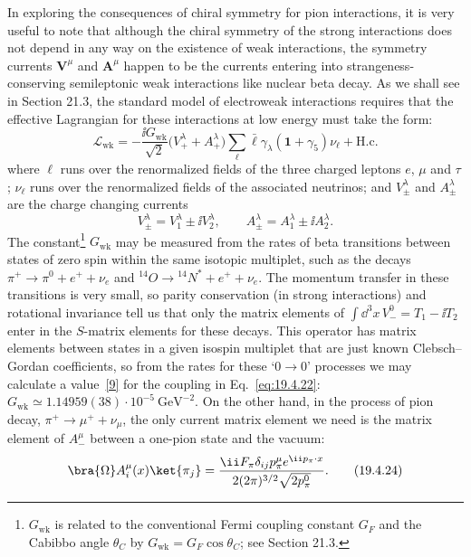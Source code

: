 In exploring the consequences of chiral symmetry for pion interactions, it is very useful to note that although the chiral symmetry of the strong interactions does not depend in any way on the existence of weak interactions, the symmetry currents $\mathbf{V}^\mu$ and $\mathbf{A}^\mu$ happen to be the currents entering into strangeness-conserving semileptonic weak interactions like nuclear beta decay. As we shall see in Section 21.3, the standard model of electroweak interactions requires that the effective Lagrangian for these interactions at low energy must take the form:
\begin{equation}
\mathcal L_{\mathrm{wk}}
=-\frac{\ii G_{\mathrm{wk}}}{\sqrt2}
\bigl(V_+^\lambda+A_+^\lambda\bigr)
\sum_\ell\bar\ell\gamma_\lambda(\mathbf{1}+\gamma_5)\nu_\ell
+\mathrm{H.c.}
\tag{19.4.22}\label{eq:19.4.22}
\end{equation}
where $\ell$ runs over the renormalized fields of the three charged leptons $e$, $\mu$ and $\tau$; $\nu_\ell$ runs over the renormalized fields of the associated neutrinos; and $V_\pm^\lambda$ and $A_\pm^\lambda$ are the charge changing currents
\begin{equation}
V_\pm^\lambda=V_1^\lambda\pm \ii V_2^\lambda,
\qquad
A_\pm^\lambda=A_1^\lambda\pm \ii A_2^\lambda.
\tag{19.4.23}\label{eq:19.4.23}
\end{equation}
The constant\footnote{$G_{\mathrm{wk}}$ is related to the conventional Fermi coupling constant $G_F$ and the Cabibbo angle $\theta_C$ by $G_{\mathrm{wk}}=G_F\cos\theta_C$; see Section 21.3.} $G_{\mathrm{wk}}$ may be measured from the rates of beta transitions between states of zero spin within the same isotopic multiplet, such as the decays $\pi^+\to\pi^0+e^++\nu_e$ and ${}^{14}O\to{}^{14}N^*+e^++\nu_e$. The momentum transfer in these transitions is very small, so parity conservation (in strong interactions) and rotational invariance tell us that only the matrix elements of $\int \dd^3x\,V_-^0=T_1-\ii T_2$ enter in the $S$-matrix elements for these decays. This operator has matrix elements between states in a given isospin multiplet that are just known Clebsch--Gordan coefficients, so from the rates for these `$0\to0$' processes we may calculate a value~\hyperref[ch19-ref-9]{[9]} for the coupling in Eq.~\eqref{eq:19.4.22}: $G_{\mathrm{wk}}\simeq1.14959(38)\cdot10^{-5}\ \mathrm{GeV}^{-2}$. On the other hand, in the process of pion decay, $\pi^+\to\mu^++\nu_\mu$, the only current matrix element we need is the matrix element of $A_-^\mu$ between a one-pion state and the vacuum:
\begin{equation}
\bra{\Omega}A_i^\mu(x)\ket{\pi_j}
=\frac{\ii F_\pi\delta_{ij}p_\pi^\mu
e^{\ii p_\pi\cdot x}}
{2(2\pi)^{3/2}\sqrt{2p_\pi^0}}.
\tag{19.4.24}\label{eq:19.4.24}
\end{equation}
